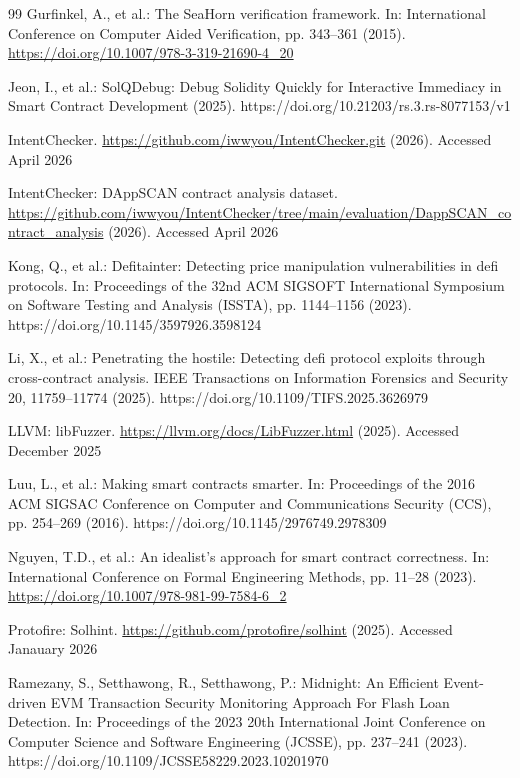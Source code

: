 \documentclass[pdflatex,sn-basic]{sn-jnl}%
\theoremstyle{thmstyleone}%
\theoremstyle{thmstyletwo}%
\theoremstyle{thmstylethree}%
\begin{document}
\begin{thebibliography}{99}
Gurfinkel, A., et al.: The SeaHorn verification framework. In: International Conference on Computer Aided Verification, pp. 343--361 (2015). \url{https://doi.org/10.1007/978-3-319-21690-4_20}

Jeon, I., et al.: SolQDebug: Debug Solidity Quickly for Interactive Immediacy in Smart Contract Development (2025). https://doi.org/10.21203/rs.3.rs-8077153/v1

IntentChecker. \url{https://github.com/iwwyou/IntentChecker.git} (2026). Accessed April 2026

IntentChecker: DAppSCAN contract analysis dataset. \url{https://github.com/iwwyou/IntentChecker/tree/main/evaluation/DappSCAN_contract_analysis} (2026). Accessed April 2026

Kong, Q., et al.: Defitainter: Detecting price manipulation vulnerabilities in defi protocols. In: Proceedings of the 32nd ACM SIGSOFT International Symposium on Software Testing and Analysis (ISSTA), pp. 1144--1156 (2023). https://doi.org/10.1145/3597926.3598124

Li, X., et al.: Penetrating the hostile: Detecting defi protocol exploits through cross-contract analysis. IEEE Transactions on Information Forensics and Security 20, 11759--11774 (2025). https://doi.org/10.1109/TIFS.2025.3626979

LLVM: libFuzzer. \url{https://llvm.org/docs/LibFuzzer.html} (2025). Accessed December 2025

Luu, L., et al.: Making smart contracts smarter. In: Proceedings of the 2016 ACM SIGSAC Conference on Computer and Communications Security (CCS), pp. 254--269 (2016). https://doi.org/10.1145/2976749.2978309

Nguyen, T.D., et al.: An idealist's approach for smart contract correctness. In: International Conference on Formal Engineering Methods, pp. 11--28 (2023). \url{https://doi.org/10.1007/978-981-99-7584-6_2}

Protofire: Solhint. \url{https://github.com/protofire/solhint} (2025). Accessed Janauary 2026

Ramezany, S., Setthawong, R., Setthawong, P.: Midnight: An Efficient Event-driven EVM Transaction Security Monitoring Approach For Flash Loan Detection. In: Proceedings of the 2023 20th International Joint Conference on Computer Science and Software Engineering (JCSSE), pp. 237--241 (2023). https://doi.org/10.1109/JCSSE58229.2023.10201970


\end{thebibliography}
\end{document}
